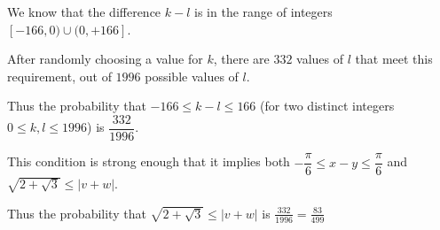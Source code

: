 We know that the difference $k - l$ is in the range of integers $[-166, 0) \cup (0, +166]$.

After randomly choosing a value for $k$, there are $332$ values of $l$ that meet this requirement, out of $1996$ possible values of $l$.

Thus the probability that $-166 \leq k - l \leq 166$ (for two distinct integers $0 \leq k, l \leq 1996$) is $\dfrac{332}{1996}$.

This condition is strong enough that it implies both $-\dfrac{\pi}{6} \leq x - y \leq \dfrac{\pi}{6}$ and $\sqrt{2 + \sqrt 3} \leq |v + w|$.

Thus the probability that $\sqrt{2 + \sqrt 3} \leq |v + w|$ is $\boxed{\frac{332}{1996} = \frac{83}{499}}$
